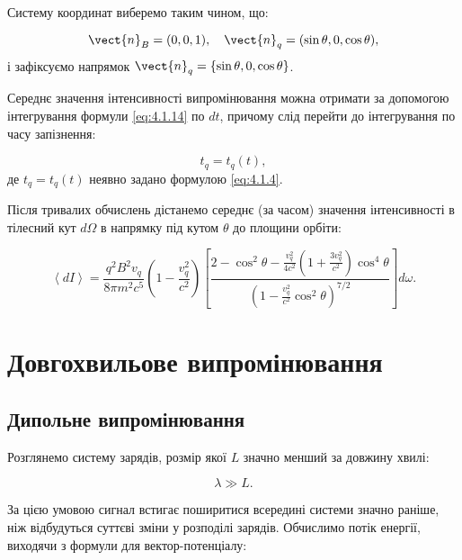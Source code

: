 Систему координат виберемо таким чином, що:

\begin{equation*}
	\vect{n}_B = (0, 0, 1), \quad \vect{n}_q = (\sin \theta, 0, \cos \theta),
\end{equation*}
і зафіксуємо напрямок \( \vect{n}_q = \{\sin \theta, 0, \cos \theta\} \).

Середнє значення інтенсивності випромінювання можна отримати за допомогою інтегрування формули \eqref{eq:4.1.14} по \( dt \), причому слід перейти до
інтегрування по часу запізнення:

\begin{equation*}
	t_q = t_q(t),
\end{equation*}
де \( t_q = t_q(t) \) неявно задано формулою \eqref{eq:4.1.4}.

Після тривалих обчислень дістанемо середнє (за часом) значення інтенсивності в тілесний кут \( d\Omega \) в напрямку під кутом \( \theta \) до площини
орбіти:


\begin{equation*}
	\left\langle dI \right\rangle  = \frac{q^2 B^2 v_q}{8\pi m^2c^5}\left( 1 - \frac{v_q^2}{c^2}\right)  \left[
		\frac{2-\cos^2\theta - \frac{v_q^2}{4c^2}\left( 1 + \frac{3v_q^2}{c^2}\right)\cos^4\theta  }{ \left( 1- \frac{v_q^2}{c^2}\cos^2\theta\right)^{7/2} }
		\right] d\omega.
\end{equation*}


\section{Довгохвильове випромінювання}

\subsection*{Дипольне випромінювання}

Розглянемо систему зарядів, розмір якої \( L \) значно менший за довжину хвилі:

\begin{equation}
	\lambda \gg L.
	\label{eq:long_wavelength_condition}
\end{equation}

За цією умовою сигнал встигає поширитися всередині системи значно раніше, ніж відбудуться суттєві зміни у розподілі зарядів. Обчислимо потік енергії,
виходячи з формули для вектор-потенціалу:

